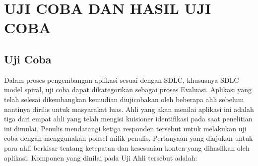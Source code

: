 
\chapter{UJI COBA DAN HASIL UJI COBA}
	\section{Uji Coba}
		Dalam proses pengembangan aplikasi sesuai dengan SDLC, khususnya SDLC model spiral, uji coba dapat dikategorikan sebagai proses Evaluasi. Aplikasi yang telah selesai dikembangkan kemudian diujicobakan oleh beberapa ahli sebelum nantinya dirilis untuk masyarakat luas. Ahli yang akan menilai aplikasi ini adalah tiga dari empat ahli yang telah mengisi kuisioner identifikasi pada saat penelitian ini dimulai. Penulis mendatangi ketiga responden tersebut untuk melakukan uji coba dengan menggunakan ponsel milik penulis. Pertanyaan yang diajukan untuk para ahli berkisar tentang ketepatan dan kesesuaian konten yang dihasilkan oleh aplikasi. Komponen yang dinilai pada Uji Ahli tersebut adalah:
